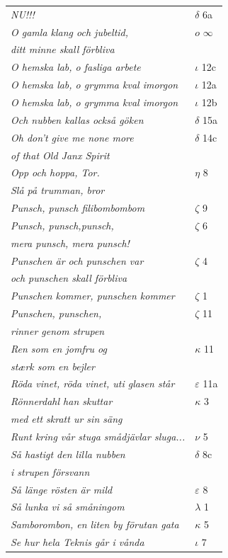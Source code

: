 \documentclass[a6paper,10pt]{article}
\begin{document}
\newpage
\begin{table}[!h]
\begin{tabular}{l l}
\textit{NU!!!}	&$\delta$ 6a\\
\textit{O gamla klang och jubeltid,}	&$o$ $\infty$\\
\textit{ditt minne skall förbliva} &\\
\textit{O hemska lab, o fasliga arbete}	&$\iota$ 12c\\
\textit{O hemska lab, o grymma kval imorgon}	&$\iota$ 12a\\
\textit{O hemska lab, o grymma kval imorgon}	&$\iota$ 12b\\
\textit{Och nubben kallas också göken}	&$\delta$ 15a\\
\textit{Oh don't give me none more}	&$\delta$ 14c\\
\textit{of that Old Janx Spirit} &\\
\textit{Opp och hoppa, Tor.}	&$\eta$ 8\\
\textit{Slå på trumman, bror} &\\
\textit{Punsch, punsch filibombombom}	&$\zeta$ 9\\
\textit{Punsch, punsch,punsch,}	&$\zeta$ 6\\
\textit{mera punsch, mera punsch!} &\\
\textit{Punschen är och punschen var}	&$\zeta$ 4\\
\textit{och punschen skall förbliva} &\\
\textit{Punschen kommer, punschen kommer}	&$\zeta$ 1\\
\textit{Punschen, punschen,}	&$\zeta$ 11\\
\textit{rinner genom strupen} &\\
\textit{Ren som en jomfru og}	&$\kappa$ 11\\
\textit{stærk som en bejler} &\\
\textit{Röda vinet, röda vinet, uti glasen står}	&$\varepsilon$ 11a\\
\textit{Rönnerdahl han skuttar}	&$\kappa$ 3\\
\textit{med ett skratt ur sin säng} &\\
\textit{Runt kring vår stuga smådjävlar sluga...}	&$\nu$ 5\\
\textit{Så hastigt den lilla nubben}	&$\delta$ 8c\\
\textit{i strupen försvann} &\\
\textit{Så länge rösten är mild}	&$\varepsilon$ 8\\
\textit{Så lunka vi så småningom}	&$\lambda$ 1\\
\textit{Samborombon, en liten by förutan gata}	&$\kappa$ 5\\
\textit{Se hur hela Teknis går i vånda}	&$\iota$ 7\\
\end{tabular}
\end{table}
\end{document}
